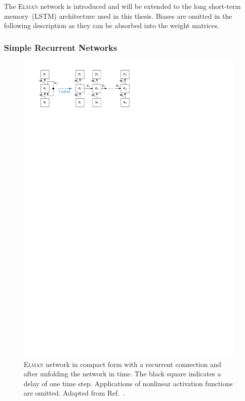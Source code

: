 The \textsc{Elman} network is introduced and will be extended to the long
short-term memory~(LSTM) architecture used in this thesis. Biases are omitted in
the following description as they can be absorbed into the weight matrices.

\subsubsection{Simple Recurrent Networks}
\label{sec:simple_recurrent_networks}
\begin{figure}[htb]
  \centering
  \includegraphics{./figures/theory/elman_rnn.pdf}
  \caption[\textsc{Elman} network]{\textsc{Elman} network in compact form with
    a recurrent connection and after unfolding the network in time. The black
    square indicates a delay of one time step. Applications of nonlinear
    activation functions are omitted. Adapted from
    Ref.~\cite{lecun_bengio_hinton_DL}.}
  \label{fig:schematic_elman_rnn}
\end{figure}

